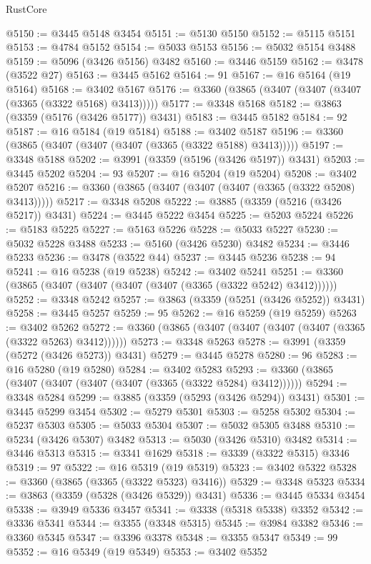 \begin{lexlean}{RustCore}
\begin{coremodule}
@5150 := @3445 @5148 @3454
@5151 := @5130 @5150
@5152 := @5115 @5151
@5153 := @4784 @5152
@5154 := @5033 @5153
@5156 := @5032 @5154 @3488
@5159 := @5096 (@3426 @5156) @3482
@5160 := @3446 @5159
@5162 := @3478 (@3522 @27)
@5163 := @3445 @5162
@5164 := 91
@5167 := @16 @5164 (@19 @5164)
@5168 := @3402 @5167
@5176 := @3360 (@3865 (@3407 (@3407 (@3407 (@3365 (@3322 @5168) @3413)))))
@5177 := @3348 @5168
@5182 := @3863 (@3359 (@5176 (@3426 @5177)) @3431)
@5183 := @3445 @5182
@5184 := 92
@5187 := @16 @5184 (@19 @5184)
@5188 := @3402 @5187
@5196 := @3360 (@3865 (@3407 (@3407 (@3407 (@3365 (@3322 @5188) @3413)))))
@5197 := @3348 @5188
@5202 := @3991 (@3359 (@5196 (@3426 @5197)) @3431)
@5203 := @3445 @5202
@5204 := 93
@5207 := @16 @5204 (@19 @5204)
@5208 := @3402 @5207
@5216 := @3360 (@3865 (@3407 (@3407 (@3407 (@3365 (@3322 @5208) @3413)))))
@5217 := @3348 @5208
@5222 := @3885 (@3359 (@5216 (@3426 @5217)) @3431)
@5224 := @3445 @5222 @3454
@5225 := @5203 @5224
@5226 := @5183 @5225
@5227 := @5163 @5226
@5228 := @5033 @5227
@5230 := @5032 @5228 @3488
@5233 := @5160 (@3426 @5230) @3482
@5234 := @3446 @5233
@5236 := @3478 (@3522 @44)
@5237 := @3445 @5236
@5238 := 94
@5241 := @16 @5238 (@19 @5238)
@5242 := @3402 @5241
@5251 := @3360 (@3865 (@3407 (@3407 (@3407 (@3407 (@3365 (@3322 @5242) @3412))))))
@5252 := @3348 @5242
@5257 := @3863 (@3359 (@5251 (@3426 @5252)) @3431)
@5258 := @3445 @5257
@5259 := 95
@5262 := @16 @5259 (@19 @5259)
@5263 := @3402 @5262
@5272 := @3360 (@3865 (@3407 (@3407 (@3407 (@3407 (@3365 (@3322 @5263) @3412))))))
@5273 := @3348 @5263
@5278 := @3991 (@3359 (@5272 (@3426 @5273)) @3431)
@5279 := @3445 @5278
@5280 := 96
@5283 := @16 @5280 (@19 @5280)
@5284 := @3402 @5283
@5293 := @3360 (@3865 (@3407 (@3407 (@3407 (@3407 (@3365 (@3322 @5284) @3412))))))
@5294 := @3348 @5284
@5299 := @3885 (@3359 (@5293 (@3426 @5294)) @3431)
@5301 := @3445 @5299 @3454
@5302 := @5279 @5301
@5303 := @5258 @5302
@5304 := @5237 @5303
@5305 := @5033 @5304
@5307 := @5032 @5305 @3488
@5310 := @5234 (@3426 @5307) @3482
@5313 := @5030 (@3426 @5310) @3482
@5314 := @3446 @5313
@5315 := @3341 @1629
@5318 := @3339 (@3322 @5315) @3346
@5319 := 97
@5322 := @16 @5319 (@19 @5319)
@5323 := @3402 @5322
@5328 := @3360 (@3865 (@3365 (@3322 @5323) @3416))
@5329 := @3348 @5323
@5334 := @3863 (@3359 (@5328 (@3426 @5329)) @3431)
@5336 := @3445 @5334 @3454
@5338 := @3949 @5336 @3457
@5341 := @3338 (@5318 @5338) @3352
@5342 := @3336 @5341
@5344 := @3355 (@3348 @5315)
@5345 := @3984 @3382
@5346 := @3360 @5345
@5347 := @3396 @3378
@5348 := @3355 @5347
@5349 := 99
@5352 := @16 @5349 (@19 @5349)
@5353 := @3402 @5352

\end{coremodule}
\end{lexlean}
